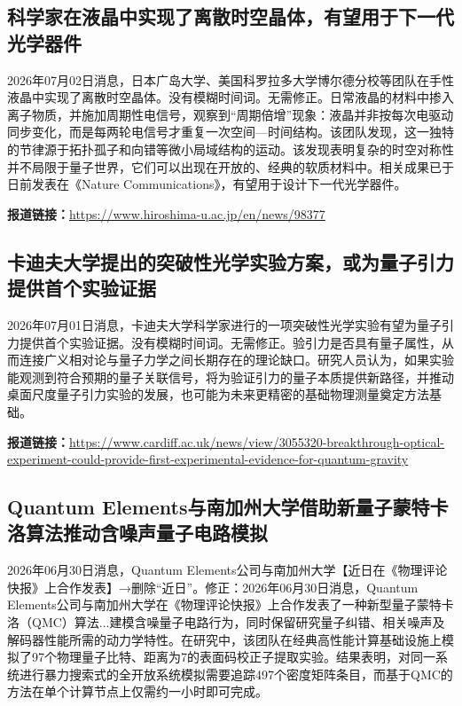 \documentclass[12pt,a4paper]{ctexart}
\begin{document}
\subsection{ 科学家在液晶中实现了离散时空晶体，有望用于下一代光学器件 }

2026年07月02日消息，日本广岛大学、美国科罗拉多大学博尔德分校等团队在手性液晶中实现了离散时空晶体。没有模糊时间词。无需修正。日常液晶的材料中掺入离子物质，并施加周期性电信号，观察到“周期倍增”现象：液晶并非按每次电驱动同步变化，而是每两轮电信号才重复一次空间—时间结构。该团队发现，这一独特的节律源于拓扑孤子和向错等微小局域结构的运动。该发现表明复杂的时空对称性并不局限于量子世界，它们可以出现在开放的、经典的软质材料中。相关成果已于日前发表在《Nature Communications》，有望用于设计下一代光学器件。

\noindent\textbf{报道链接：}\url{https://www.hiroshima-u.ac.jp/en/news/98377}

\subsection{ 卡迪夫大学提出的突破性光学实验方案，或为量子引力提供首个实验证据 }

2026年07月01日消息，卡迪夫大学科学家进行的一项突破性光学实验有望为量子引力提供首个实验证据。没有模糊时间词。无需修正。验引力是否具有量子属性，从而连接广义相对论与量子力学之间长期存在的理论缺口。研究人员认为，如果实验能观测到符合预期的量子关联信号，将为验证引力的量子本质提供新路径，并推动桌面尺度量子引力实验的发展，也可能为未来更精密的基础物理测量奠定方法基础。

\noindent\textbf{报道链接：}\url{https://www.cardiff.ac.uk/news/view/3055320-breakthrough-optical-experiment-could-provide-first-experimental-evidence-for-quantum-gravity}

\subsection{ Quantum Elements与南加州大学借助新量子蒙特卡洛算法推动含噪声量子电路模拟 }

2026年06月30日消息，Quantum Elements公司与南加州大学【近日在《物理评论快报》上合作发表】→删除“近日”。修正：2026年06月30日消息，Quantum Elements公司与南加州大学在《物理评论快报》上合作发表了一种新型量子蒙特卡洛（QMC）算法...建模含噪量子电路行为，同时保留研究量子纠错、相关噪声及解码器性能所需的动力学特性。在研究中，该团队在经典高性能计算基础设施上模拟了97个物理量子比特、距离为7的表面码校正子提取实验。结果表明，对同一系统进行暴力搜索式的全开放系统模拟需要追踪497个密度矩阵条目，而基于QMC的方法在单个计算节点上仅需约一小时即可完成。
\end{document}
